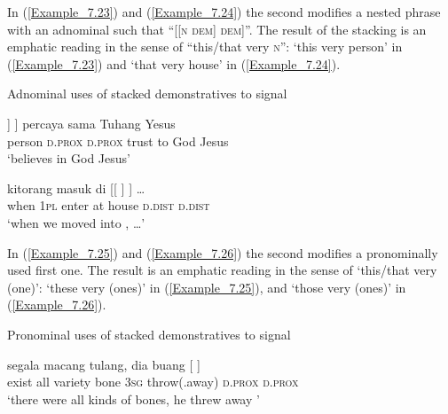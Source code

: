 {In (\ref{Example_7.23}) and (\ref{Example_7.24}) the second  modifies a nested  phrase with an adnominal  such that ``[[\textsc{n} \textsc{dem}] \textsc{dem}]''. The result of the stacking is an emphatic reading in the sense of ``this/that very \textsc{n}'':  ‘this very person’ in (\ref{Example_7.23}) and  ‘that very house’ in (\ref{Example_7.24}).


\begin{styleExampleTitle}
Adnominal uses of stacked demonstratives to signal 
\end{styleExampleTitle}
\ea
\label{Example_7.23}
\gll {[[\bluebold{orang}} {]} {]} {percaya} {sama} {Tuhang} {Yesus}\\ %
 person  \textsc{d.prox}  \textsc{d.prox}  trust  to  God  Jesus\\
\glt 
‘believes in God Jesus’ \textstyleExampleSource{[081006-022-CvEx.0177]}
\z

\ea
\label{Example_7.24}
 {kitorang} {masuk} {di} {[[} {]} {]} {\ldots}\\ %
 when  \textsc{1pl}  enter  at  house  \textsc{d.dist}  \textsc{d.dist}  \\
\glt 
‘when we moved into , \ldots’ \textstyleExampleSource{[081006-022-CvEx.0167]}
\z



In (\ref{Example_7.25}) and (\ref{Example_7.26}) the second  modifies a pronominally used first one. The result is an emphatic reading in the sense of ‘this/that very (one)’:  ‘these very (ones)’ in (\ref{Example_7.25}), and  ‘those very (ones)’ in (\ref{Example_7.26}).


\begin{styleExampleTitle}
Pronominal uses of stacked demonstratives to signal 
\end{styleExampleTitle}

\ea
\label{Example_7.25}
 {segala} {macang} {tulang,} {dia} {buang} {[} {]}\\ %
 exist  all  variety  bone  \textsc{3sg}  throw(.away)  \textsc{d.prox}  \textsc{d.prox}\\
\glt 
‘there were all kinds of bones, he threw away ’ \textstyleExampleSource{[080922-010a-CvNF.0101]}
\z

}
